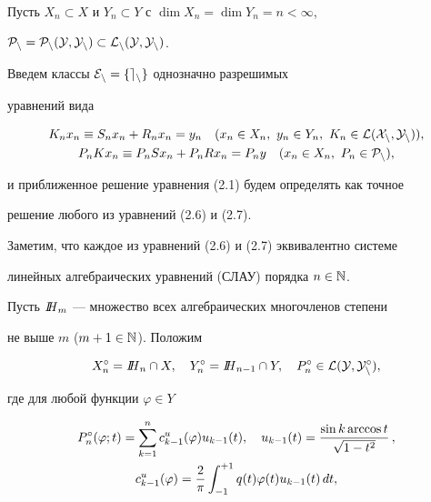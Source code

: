 Пусть $X_n\subset X$ и $Y_n\subset Y$ с $\dim X_n=\dim Y_n=n<\infty$,


$\cal P_n=\cal P_n(Y,Y_n)\subset \cal L_n(Y,Y_n)$.


Введем классы $\cal E_n=\{ e_n\}$ однозначно разрешимых


уравнений вида


\begin{gather}


K_nx_n\equiv S_nx_n+R_n x_n=y_n\quad (x_n\in X_n,\ y_n\in Y_n,\


K_n\in \cal L(X_n, Y_n)), \\


%


P_n Kx_n\equiv P_nSx_n+P_nRx_n=P_ny\quad (x_n\in X_n,\ P_n\in


\cal P_n),


\end{gather}


и приближенное решение уравнения (2.1) будем определять как точное


решение любого из уравнений (2.6) и (2.7).


Заметим, что каждое из уравнений (2.6) и (2.7) эквивалентно системе


линейных алгебраических уравнений (СЛАУ) порядка $n\in \Bbb N$.





Пусть $\text{\it I\/}\hspace{-1.25mm}\text{\it H\/}_m$ --- множество всех алгебраических многочленов степени


не выше $m$ ($m+1\in \Bbb N$). Положим


$$


X_n^\circ =\bll{H}_n\cap X,\quad Y_n^\circ =\bll{H}_{n-1}\cap Y,\quad


P_n^\circ\in \cal L(Y,Y_n^\circ ),


$$


где для любой функции $\varphi\in Y$


\begin{gather}


P_n^\circ (\varphi ;t)=\sum_{k=1}^nc_{k-1}^u(\varphi)u_{k-1}(t),\quad


u_{k-1}(t)=\frac{\sin{k\text{\,arccos\,}t}}{\sqrt{1-t^2}}\, ,\\


%


c_{k-1}^u(\varphi)=\frac{2}{\pi}\int_{-1}^{+1}q(t)\varphi(t)


u_{k-1}(t)\, dt,


\end{gather}


